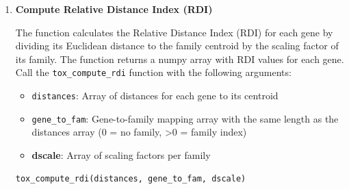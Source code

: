 \documentclass[11pt]{article}
\begin{document}
\begin{enumerate}
\begin{enumerate}
\begin{itemize}
	      	      	\item \textbf{perm\_tmp}: Permutation array for sorting
	      	      	      
	      	      	\item \textbf{stack\_left\_tmp}: Stack array for sorting
	      	      	      
	      	      	\item \textbf{stack\_right\_tmp}: Stack array for sorting
	      	      	      
	      	      	\item \textbf{family\_distances}: Work array for sorting
	      	      \end{itemize}
	      	      \begin{lstlisting}[language=Python, caption={Python Compute Family Scaling (Expert Version)}]
tox_compute_family_scaling_expert(distances, gene_to_fam, perm_tmp, 
                stack_left_tmp, stack_right_tmp, family_distances)
	      	      \end{lstlisting}
	      	      
	      	\item \textbf{Compute Relative Distance Index (RDI)}
	      	      
	      	      The function calculates the Relative Distance Index (RDI) for each gene
	      	      by dividing its Euclidean distance to the family centroid by the scaling
	      	      factor of its family. The function returns a numpy array with RDI
	      	      values for each gene. Call the \texttt{tox\_compute\_rdi} function
	      	      with the following arguments:
	      	      
	      	      \begin{itemize}
	      	      	\item \texttt{distances}: Array of distances for each gene to its centroid
	      	      	      
	      	      	\item \texttt{gene\_to\_fam}: Gene-to-family mapping array with the same
	      	      	      length as the distances array (0 = no family, \textgreater 0 = family
	      	      	      index)
	      	      	      
	      	      	\item \textbf{dscale}: Array of scaling factors per family
	      	      \end{itemize}
	      	      
	      	      \begin{lstlisting}[language=Python, caption={Python Compute Relative Distance Index (RDI)}]
tox_compute_rdi(distances, gene_to_fam, dscale)
	      	      \end{lstlisting}
	      	      

\end{enumerate}
\end{enumerate}
\end{document}
